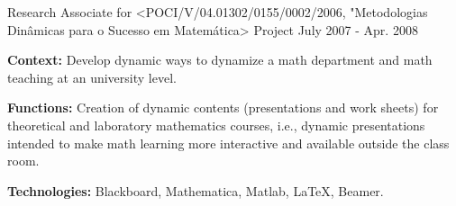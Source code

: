 \begin{cventries}
  \cventry    
    {Research Associate for <POCI/V/04.01302/0155/0002/2006, "Metodologias Din\^amicas para o Sucesso em Matem\'atica> Project} %
    {} %
    {} %
    {July 2007 - Apr. 2008} %
    {
      \begin{cvitems} %
		\item {\textbf{Context:} Develop dynamic ways to dynamize a math department and math teaching at an university level.}
		\item {\textbf{Functions:} Creation of dynamic contents (presentations and work sheets) for theoretical and laboratory mathematics courses, i.e., dynamic presentations intended to make math learning more interactive and available outside the class room.}
  		\item {\textbf{Technologies:} Blackboard, Mathematica, Matlab, LaTeX, Beamer.} %
      \end{cvitems}
    }  
     
\end{cventries}
